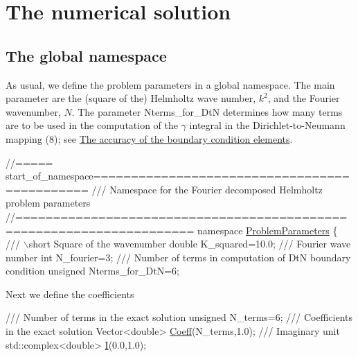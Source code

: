  

\hypertarget{index_num_soln}{}\section{The numerical solution}\label{index_num_soln}
\hypertarget{index_namespace}{}\subsection{The global namespace}\label{index_namespace}
As usual, we define the problem parameters in a global namespace. The main parameter are the (square of the) Helmholtz wave number, $ k^2 $, and the Fourier wavenumber, $ N $. The parameter {\ttfamily Nterms\+\_\+for\+\_\+\+DtN} determines how many terms are to be used in the computation of the $ \gamma $ integral in the Dirichlet-\/to-\/\+Neumann mapping (8); see \hyperlink{index_acc}{The accuracy of the boundary condition elements}.

 
\begin{DoxyCodeInclude}
\textcolor{comment}{//===== start\_of\_namespace=============================================}
\textcolor{comment}{/// Namespace for the Fourier decomposed Helmholtz problem parameters}
\textcolor{comment}{}\textcolor{comment}{//=====================================================================}
\textcolor{keyword}{namespace }\hyperlink{namespaceProblemParameters}{ProblemParameters}
\{\textcolor{comment}{}
\textcolor{comment}{ /// \(\backslash\)short Square of the wavenumber}
\textcolor{comment}{} \textcolor{keywordtype}{double} K\_squared=10.0;
 \textcolor{comment}{}
\textcolor{comment}{ /// Fourier wave number}
\textcolor{comment}{} \textcolor{keywordtype}{int} N\_fourier=3;
 \textcolor{comment}{}
\textcolor{comment}{ /// Number of terms in computation of DtN boundary condition}
\textcolor{comment}{} \textcolor{keywordtype}{unsigned} Nterms\_for\_DtN=6;

\end{DoxyCodeInclude}


Next we define the coefficients


\begin{DoxyCodeInclude}
\textcolor{comment}{}
\textcolor{comment}{ /// Number of terms in the exact solution}
\textcolor{comment}{} \textcolor{keywordtype}{unsigned} N\_terms=6; 
 \textcolor{comment}{}
\textcolor{comment}{ /// Coefficients in the exact solution}
\textcolor{comment}{} Vector<double> \hyperlink{namespaceProblemParameters_acb1788444ef78fe2adec824504f24246}{Coeff}(N\_terms,1.0);
\textcolor{comment}{}
\textcolor{comment}{ /// Imaginary unit }
\textcolor{comment}{} std::complex<double> \hyperlink{namespacePlanarWave_a541691caf71477c8c389062797c0fdab}{I}(0.0,1.0); 

\end{DoxyCodeInclude}


